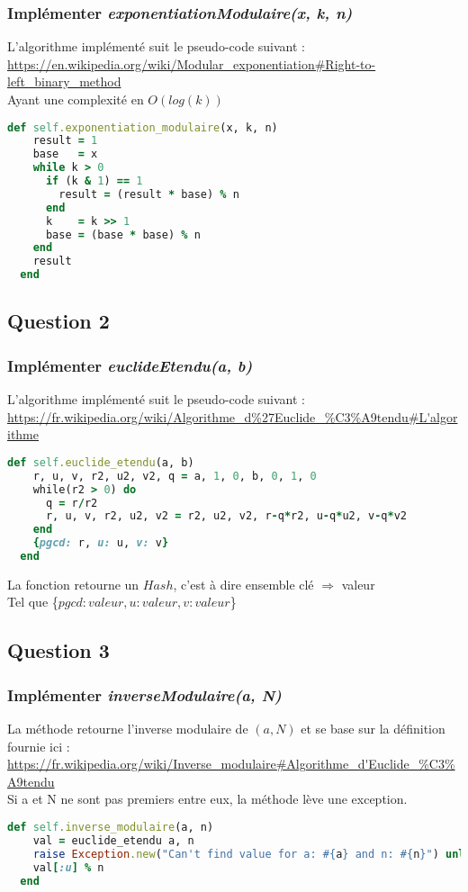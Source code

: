 \documentclass[a4paper,10pt]{article}
\begin{document}
\subsubsection{Implémenter \textit{exponentiationModulaire(x, k, n)}}
L'algorithme implémenté suit le pseudo-code suivant :\\
 \url{https://en.wikipedia.org/wiki/Modular_exponentiation#Right-to-left_binary_method}\\
 Ayant une complexité en $O(log(k))$
\begin{lstlisting}[language=Ruby]
  def self.exponentiation_modulaire(x, k, n)
    result = 1
    base   = x
    while k > 0
      if (k & 1) == 1
        result = (result * base) % n
      end
      k    = k >> 1
      base = (base * base) % n
    end
    result
  end
\end{lstlisting}

\subsection{Question 2}
\subsubsection{Implémenter \textit{euclideEtendu(a, b)}}
L'algorithme implémenté suit le pseudo-code suivant :\\
 \url{https://fr.wikipedia.org/wiki/Algorithme_d%27Euclide_%C3%A9tendu#L'algorithme}\\
 \begin{lstlisting}[language=Ruby]
   def self.euclide_etendu(a, b)
    r, u, v, r2, u2, v2, q = a, 1, 0, b, 0, 1, 0
    while(r2 > 0) do
      q = r/r2
      r, u, v, r2, u2, v2 = r2, u2, v2, r-q*r2, u-q*u2, v-q*v2
    end
    {pgcd: r, u: u, v: v}
  end
\end{lstlisting}
La fonction retourne un $Hash$, c'est à dire ensemble clé $\Rightarrow$ valeur\\
Tel que \{$pgcd: valeur, u: valeur, v: valeur$\}

\clearpage
\subsection{Question 3}
\subsubsection{Implémenter \textit{inverseModulaire(a, N)}}
La méthode retourne l'inverse modulaire de $(a, N)$ et se base sur la définition fournie ici :\\
\url{https://fr.wikipedia.org/wiki/Inverse_modulaire#Algorithme_d'Euclide_%C3%A9tendu}\\
Si a et N ne sont pas premiers entre eux, la méthode lève une exception.
\begin{lstlisting}[language=Ruby]
  def self.inverse_modulaire(a, n)
    val = euclide_etendu a, n
    raise Exception.new("Can't find value for a: #{a} and n: #{n}") unless val[:pgcd] == 1
    val[:u] % n
  end
\end{lstlisting}
\end{document}
